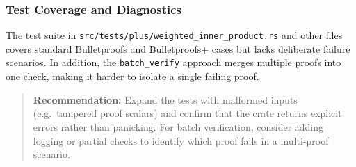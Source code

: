 \documentclass[12pt,a4paper]{article}
\begin{document}
\subsubsection{Test Coverage and Diagnostics}
The test suite in \texttt{src/tests/plus/weighted\_inner\_product.rs} and other files covers standard Bulletproofs and Bulletproofs+ cases but lacks deliberate failure scenarios. In addition, the \texttt{batch\_verify} approach merges multiple proofs into one check, making it harder to isolate a single failing proof.
\begin{quote}
    \textbf{Recommendation:} Expand the tests with malformed inputs (e.g.\ tampered proof scalars) and confirm that the crate returns explicit errors rather than panicking. For batch verification, consider adding logging or partial checks to identify which proof fails in a multi-proof scenario.
\end{quote}


\end{document}
